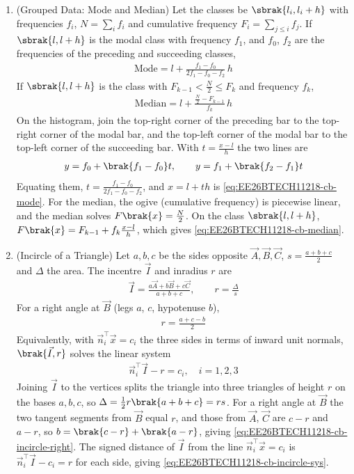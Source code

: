 \begin{enumerate}[label=\thesubsection.\arabic*, ref=\thesubsection.\theenumi,itemsep=1.5em]
\item (Grouped Data: Mode and Median) Let the classes be $\sbrak{l_i, l_i+h}$ with frequencies $f_i$, $N=\sum_i f_i$ and cumulative frequency $F_i = \sum_{j\le i} f_j$. If $\sbrak{l,l+h}$ is the modal class with frequency $f_1$, and $f_0$, $f_2$ are the frequencies of the preceding and succeeding classes,
\begin{align}
\text{Mode} = l + \frac{f_1-f_0}{2f_1-f_0-f_2}\,h
\label{eq:EE26BTECH11218-cb-mode}
\end{align}
If $\sbrak{l,l+h}$ is the class with $F_{k-1} < \frac{N}{2} \le F_k$ and frequency $f_k$,
\begin{align}
\text{Median} = l + \frac{\frac{N}{2}-F_{k-1}}{f_k}\,h
\label{eq:EE26BTECH11218-cb-median}
\end{align}
\solution On the histogram, join the top-right corner of the preceding bar to the top-right corner of the modal bar, and the top-left corner of the modal bar to the top-left corner of the succeeding bar. With $t = \frac{x-l}{h}$ the two lines are
\begin{align}
y = f_0 + \brak{f_1-f_0}t, \qquad y = f_1 + \brak{f_2-f_1}t
\end{align}
Equating them, $t = \frac{f_1-f_0}{2f_1-f_0-f_2}$, and $x = l + th$ is \eqref{eq:EE26BTECH11218-cb-mode}. For the median, the ogive (cumulative frequency) is piecewise linear, and the median solves $F\brak{x}=\frac{N}{2}$. On the class $\sbrak{l,l+h}$, $F\brak{x} = F_{k-1} + f_k\frac{x-l}{h}$, which gives \eqref{eq:EE26BTECH11218-cb-median}.

\item (Incircle of a Triangle) Let $a,b,c$ be the sides opposite $\vec{A},\vec{B},\vec{C}$, $s=\frac{a+b+c}{2}$ and $\Delta$ the area. The incentre $\vec{I}$ and inradius $r$ are
\begin{align}
\vec{I} = \frac{a\vec{A}+b\vec{B}+c\vec{C}}{a+b+c}, \qquad r = \frac{\Delta}{s}
\label{eq:EE26BTECH11218-cb-incircle}
\end{align}
For a right angle at $\vec{B}$ (legs $a$, $c$, hypotenuse $b$),
\begin{align}
r = \frac{a+c-b}{2}
\label{eq:EE26BTECH11218-cb-incircle-right}
\end{align}
Equivalently, with $\vec{n}_i^{\top}\vec{x}=c_i$ the three sides in terms of inward unit normals, $\brak{\vec{I},r}$ solves the linear system
\begin{align}
\vec{n}_i^{\top}\vec{I} - r = c_i, \quad i = 1,2,3
\label{eq:EE26BTECH11218-cb-incircle-sys}
\end{align}
\solution Joining $\vec{I}$ to the vertices splits the triangle into three triangles of height $r$ on the bases $a,b,c$, so $\Delta = \frac{1}{2}r\brak{a+b+c} = rs$. For a right angle at $\vec{B}$ the two tangent segments from $\vec{B}$ equal $r$, and those from $\vec{A}$, $\vec{C}$ are $c-r$ and $a-r$, so $b = \brak{c-r}+\brak{a-r}$, giving \eqref{eq:EE26BTECH11218-cb-incircle-right}. The signed distance of $\vec{I}$ from the line $\vec{n}_i^{\top}\vec{x}=c_i$ is $\vec{n}_i^{\top}\vec{I}-c_i = r$ for each side, giving \eqref{eq:EE26BTECH11218-cb-incircle-sys}.


\end{enumerate}
